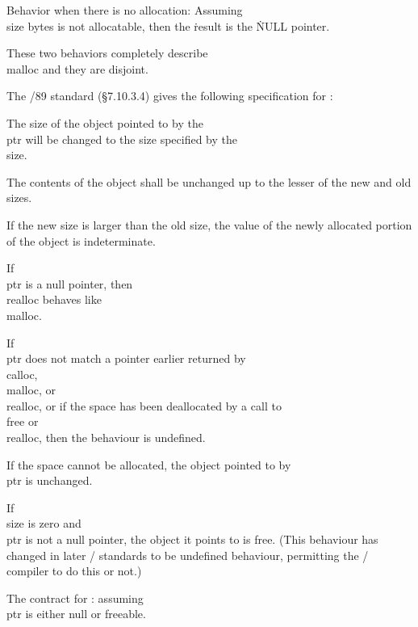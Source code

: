 \bull Behavior when there is no allocation: Assuming \\{size} bytes is
not allocatable, then the \.{result} is the \.{NULL} pointer.

\medskip
These two behaviors completely describe \\{malloc} and they are disjoint.

\fi

The \CEE/89 standard (\S7.10.3.4) gives the following specification
for :


\bull
The size of the object pointed to by the \\{ptr} will be changed to
the size specified by the \\{size}.

\bull
The contents of the object shall be unchanged up to the lesser of the
new and old sizes.

\bull
If the new size is larger than the old size, the value of the newly
allocated portion of the object is indeterminate.

\bull
If \\{ptr} is a null pointer, then \\{realloc} behaves
like \\{malloc}.

\bull
If \\{ptr} does not match a pointer earlier returned
by \\{calloc}, \\{malloc}, or \\{realloc}, or if the space has been
deallocated by a call to \\{free} or \\{realloc}, then the behaviour
is undefined.

\bull
If the space cannot be allocated, the object pointed to by \\{ptr} is
unchanged.

\bull
If \\{size} is zero and \\{ptr} is not a null pointer, the object it
points to is free. (This behaviour has changed in later \CEE/
standards to be undefined behaviour, permitting the \CEE/ compiler to
do this or not.)

\medskip
The contract for :
assuming \\{ptr} is either null or freeable.

